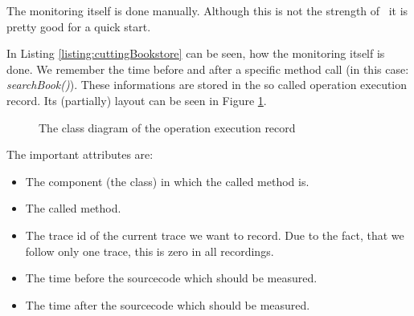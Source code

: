       

      

      
	  
      The monitoring itself is done manually. Although this is not the strength of \Kieker\ it is pretty good for a quick start.
	  
      
	  
      In Listing \ref{listing:cuttingBookstore} can be seen, how the monitoring itself is done. We remember the time before and after a specific method call (in this case: \textit{searchBook()}). These informations are stored in the so called operation execution record. Its (partially) layout can be seen in Figure \ref{image:operationexecutionrecordclassdiagram}.
	  
	  \begin{figure}[H]
		\begin{center}
		\caption{The class diagram of the operation execution record}
		\label{image:operationexecutionrecordclassdiagram}
      \end{center}
    \end{figure}
	  
	The important attributes are:
	\begin{itemize}
		\item The component (the class) in which the called method is.
		\item The called method.
		\item The trace id of the current trace we want to record. Due to the fact, that we follow only one trace, this is zero in all recordings.
		\item The time before the sourcecode which should be measured.
		\item The time after the sourcecode which should be measured.
    \end{itemize}
      
